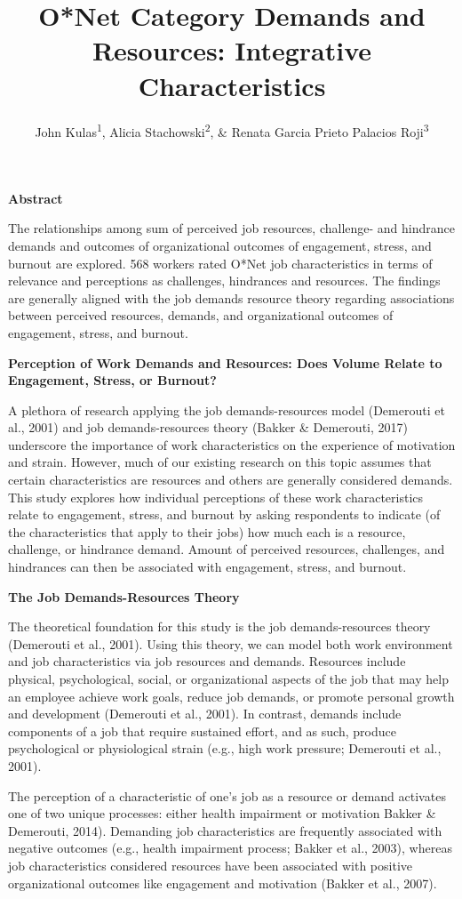 \documentclass[
  man]{apa6}
\title{O*Net Category Demands and Resources: Integrative Characteristics}
\author{John Kulas\textsuperscript{1}, Alicia Stachowski\textsuperscript{2}, \& Renata Garcia Prieto Palacios Roji\textsuperscript{3}}
\date{}
\affiliation{\vspace{0.5cm}\textsuperscript{1} eRg\\\textsuperscript{2} University of Wisconsin - Stout\\\textsuperscript{3} PepsiCo}
\begin{document}
\maketitle

\textbf{Abstract}

The relationships among sum of perceived job resources, challenge- and hindrance demands and outcomes of organizational outcomes of engagement, stress, and burnout are explored. 568 workers rated O*Net job characteristics in terms of relevance and perceptions as challenges, hindrances and resources. The findings are generally aligned with the job demands resource theory regarding associations between perceived resources, demands, and organizational outcomes of engagement, stress, and burnout.

\textbf{Perception of Work Demands and Resources: Does Volume Relate to Engagement, Stress, or Burnout?}

A plethora of research applying the job demands-resources model (Demerouti et al., 2001) and job demands-resources theory (Bakker \& Demerouti, 2017) underscore the importance of work characteristics on the experience of motivation and strain. However, much of our existing research on this topic assumes that certain characteristics are resources and others are generally considered demands. This study explores how individual perceptions of these work characteristics relate to engagement, stress, and burnout by asking respondents to indicate (of the characteristics that apply to their jobs) how much each is a resource, challenge, or hindrance demand. Amount of perceived resources, challenges, and hindrances can then be associated with engagement, stress, and burnout.

\textbf{The Job Demands-Resources Theory}

The theoretical foundation for this study is the job demands-resources theory (Demerouti et al., 2001). Using this theory, we can model both work environment and job characteristics via job resources and demands. Resources include physical, psychological, social, or organizational aspects of the job that may help an employee achieve work goals, reduce job demands, or promote personal growth and development (Demerouti et al., 2001). In contrast, demands include components of a job that require sustained effort, and as such, produce psychological or physiological strain (e.g., high work pressure; Demerouti et al., 2001).

The perception of a characteristic of one's job as a resource or demand activates one of two unique processes: either health impairment or motivation Bakker \& Demerouti, 2014). Demanding job characteristics are frequently associated with negative outcomes (e.g., health impairment process; Bakker et al., 2003), whereas job characteristics considered resources have been associated with positive organizational outcomes like engagement and motivation (Bakker et al., 2007).
\end{document}
